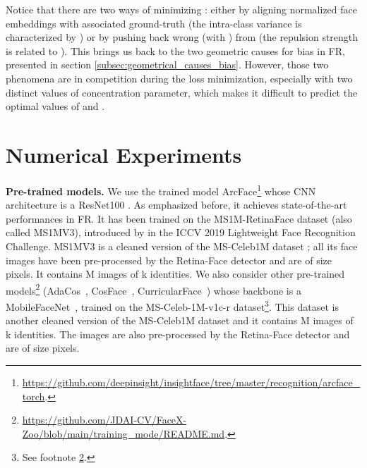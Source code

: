 \documentclass[nohyperref]{article}
\theoremstyle{plain}
\theoremstyle{definition}
\theoremstyle{remark}
\begin{document}
Notice that there are two ways of minimizing : either by aligning normalized face embeddings  with associated ground-truth  (the intra-class variance is characterized by ) or by pushing back wrong  (with ) from  (the repulsion strength is related to ). This brings us back to the two geometric causes for bias in FR, presented in section \ref{subsec:geometrical_causes_bias}.
However, those two phenomena are in competition during the loss minimization, especially with two distinct values of concentration parameter, which makes it difficult to predict the optimal values of  and . 





 
\section{Numerical Experiments} \label{sec:expe}

{\bf Pre-trained models.} We use the trained model ArcFace\footnote{\url{https://github.com/deepinsight/insightface/tree/master/recognition/arcface_torch}.} whose CNN architecture is a ResNet100 \cite{resnet100_forFR}. As emphasized before, it achieves state-of-the-art performances in FR. It has been trained on the MS1M-RetinaFace dataset (also called MS1MV3), introduced by \cite{ms1m_retinaface} in the ICCV 2019 Lightweight Face Recognition Challenge. MS1MV3 is a cleaned version of the MS-Celeb1M dataset \cite{ms-celeb-1m}; all its face images have been pre-processed by the Retina-Face detector \cite{retinaface_detector} and are of size  pixels. It  contains M images of k identities. We also consider other pre-trained models\footnote{\label{footnote:faceX_zoo}\url{https://github.com/JDAI-CV/FaceX-Zoo/blob/main/training_mode/README.md}.} (AdaCos~\cite{adacos}, CosFace~\cite{cosface}, CurricularFace~\cite{curricularface}) whose backbone is a MobileFaceNet~\cite{mobilefacenets}, trained on the MS-Celeb-1M-v1c-r dataset\footnote{See footnote \ref{footnote:faceX_zoo}.}. This dataset is another cleaned version of the MS-Celeb1M dataset and it contains M images of k identities. The images are also pre-processed by the Retina-Face detector and are of size  pixels.
\end{document}
